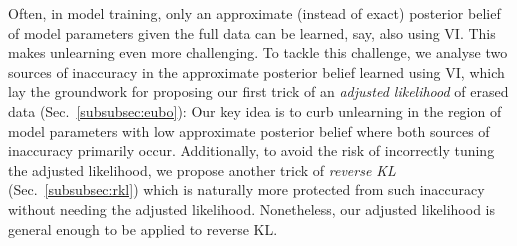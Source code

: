 \documentclass{article}
\theoremstyle{definition}
\newcommand{\mcl}[1]{\mathcal{#1}}
\begin{document}
Often, in model training, only an approximate (instead of exact) posterior belief of model parameters given the full data can be learned, say, also using VI. This makes unlearning even more challenging.
To tackle this challenge, we analyse two sources of inaccuracy in the approximate posterior belief learned using VI, which lay the groundwork for proposing our first trick of an \emph{adjusted likelihood} of erased data (Sec.~\ref{subsubsec:eubo}): %
Our key idea is to curb
unlearning in the region of model parameters with low  approximate posterior belief where both sources of inaccuracy primarily occur.
Additionally, to avoid the risk of incorrectly tuning the adjusted likelihood, we propose another trick of \emph{reverse KL}  (Sec.~\ref{subsubsec:rkl}) which is naturally more protected from such inaccuracy without needing the adjusted likelihood. Nonetheless, our adjusted likelihood is general enough to be applied to reverse KL. 

\end{document}
